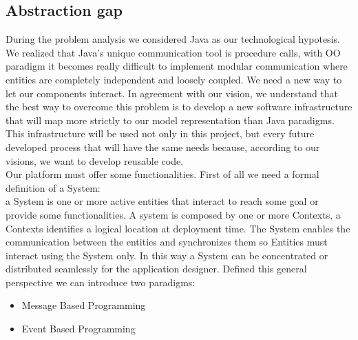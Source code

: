 \documentclass{llncs}
\begin{document}
\subsection{Abstraction gap}
During the problem analysis we considered Java as our technological hypotesis. We realized that Java's unique communication tool is procedure calls, with OO paradigm it becomes really difficult to implement modular communication where entities are completely independent and loosely coupled. We need a new way to let our components interact.
In agreement with our vision, we understand that the best way to overcome this problem is to develop a new software infrastructure that will map more strictly to our model representation than Java paradigms.
This infrastructure will be used not only in this project, but every future developed process that will have the same needs because, according to our visions, we want to develop reusable code.\\
Our platform must offer some functionalities.
First of all we need a formal definition of a System:\\
a System is one or more active entities that interact to reach some goal or provide some functionalities. A system is composed by one or more Contexts, a Contexts identifies a logical location at deployment time. The System enables the communication between the entities and synchronizes them so Entities must interact using the System only. In this way a System can be concentrated or distributed seamlessly for the application designer.
Defined this general perspective we can introduce two paradigms: 
\begin{itemize}
	\item Message Based Programming
	\item Event Based Programming
\end{itemize}
\end{document}
